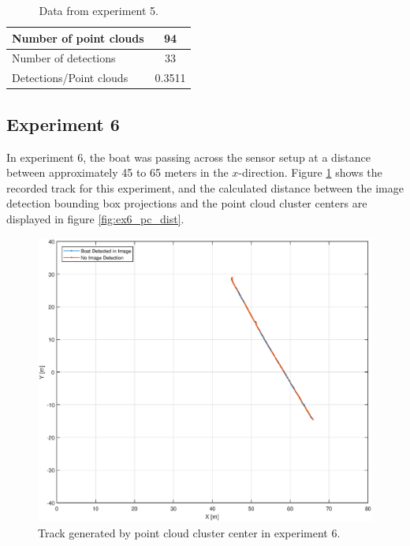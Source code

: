 \begin{table}[H]
	\centering
	\begin{tabularx}{.7\linewidth}{L c}
		\toprule
		Number of point clouds & 94\\
		\midrule
		Number of detections & 33\\
		\midrule
		Detections/Point clouds & 0.3511 \\
		\bottomrule
	\end{tabularx}
	\caption{Data from experiment 5.}
	\label{tab:exp5}
\end{table}
\subsection{Experiment 6}
In experiment 6, the boat was passing across the sensor setup at a distance between approximately 45 to 65 meters in the $x$-direction. Figure \ref{fig:ex6_track} shows the recorded track for this experiment, and the calculated distance between the image detection bounding box projections and the point cloud cluster centers are displayed in figure \ref{fig:ex6_pc_dist}.  
\begin{figure}[H]
	\centering
	\includegraphics[width=.8\linewidth]{fig/exp_6_track.eps}
	\caption{Track generated by point cloud cluster center in experiment 6.}
	\label{fig:ex6_track}
\end{figure}
